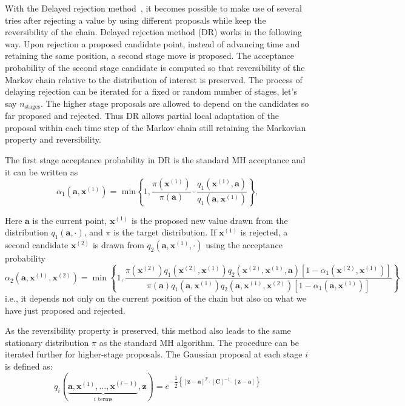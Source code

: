 With the Delayed rejection method~\cite{Mira01}, it becomes possible to make use of several tries after rejecting a value by using different proposals while keep the reversibility of the chain. Delayed rejection method (DR) works in the following way. Upon rejection a proposed candidate point, instead of advancing time and retaining the same position, a second stage move is proposed. The acceptance probability of the second stage candidate is computed so that reversibility of the Markov chain relative to the distribution of interest is preserved. The process of delaying rejection can be iterated for a fixed or random number of stages, let's say $n_\text{stages}$. The higher stage proposals are allowed to depend on the candidates so far proposed and rejected. Thus DR allows partial local adaptation of the proposal within each time step of the Markov chain still retaining the Markovian property and reversibility.

The first stage acceptance probability in DR is the standard MH acceptance and it can be written as
\begin{equation*}
\alpha_1(\mathbf{a},\mathbf{x}^{(1)}) = \text{ min}
\left\{ 1,
\frac{\pi(\mathbf{x}^{(1)})}{\pi(\mathbf{a})} \cdot
\frac{q_1(\mathbf{x}^{(1)},\mathbf{a})}{q_1(\mathbf{a},\mathbf{x}^{(1)})}
\right\},
\end{equation*}

Here $\mathbf{a}$ is the current point, $\mathbf{x}^{(1)}$ is the proposed new value drawn from the distribution $q_1(\mathbf{a}, \cdot)$, and $\pi$ is the target distribution.  If $\mathbf{x}^{(1)}$ is rejected, a second candidate $\mathbf{x}^{(2)}$ is drawn from $q_2(\mathbf{a}, \mathbf{x}^{(1)} , \cdot)$ using the acceptance probability
\begin{equation*}
\alpha_2( \mathbf{a}, \mathbf{x}^{(1)}, \mathbf{x}^{(2)}) =\min \left\{1,
\dfrac{\pi( \mathbf{x}^{(2)}) q_1( \mathbf{x}^{(2)}, \mathbf{x}^{(1)}) q_2( \mathbf{x}^{(2)}, \mathbf{x}^{(1)}, \mathbf{a})[1 - \alpha_1( \mathbf{x}^{(2)} , \mathbf{x}^{(1)} )]}{\pi( \mathbf{a}) q_1( \mathbf{a}, \mathbf{x}^{(1)}) q_2( \mathbf{a}, \mathbf{x}^{(1)}, \mathbf{x}^{(2)})[1 - \alpha_1 ( \mathbf{a}, \mathbf{x}^{(1)} )]}
\right\}
\end{equation*}
%
i.e., it depends not only on the current position of the chain but also on what we have just proposed and rejected.

As the reversibility property is preserved, this method also leads to the same stationary distribution $\pi$ as the standard MH algorithm. The procedure can be iterated further for higher-stage proposals. 
%
The Gaussian proposal at each stage $i$ is defined as:
\begin{equation} %
\label{eq:qi}
q_i(\underbrace{\mathbf{a},\mathbf{x}^{(1)},\ldots,\mathbf{x}^{(i-1)}}_{i\text{ terms}},\mathbf{z})
=
e^{-\dfrac{1}{2}{\displaystyle \left\{[\mathbf{z}-\mathbf{a}]^T\cdot \left[\mathbf{C}\right]^{-1}\cdot[\mathbf{z}-\mathbf{a}]\right\}}} 
\end{equation}

